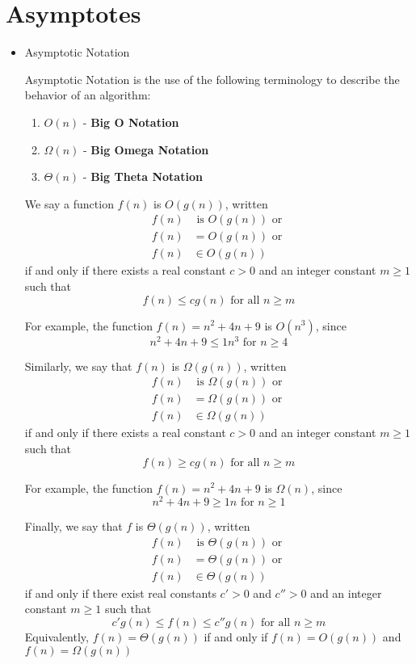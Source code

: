 \documentclass[a4paper]{article}
\begin{document}
\section{Asymptotes}
\begin{itemize}
\item Asymptotic Notation

Asymptotic Notation is the use of the following terminology to describe the behavior of an algorithm:
\begin{enumerate}
\item $O(n)$ - \textbf{Big O Notation}
\item $\Omega(n)$ - \textbf{Big Omega Notation}
\item $\Theta(n)$ - \textbf{Big Theta Notation}
\end{enumerate}

We say a function $f(n)$ is $O(g(n))$, written \begin{align*}f(n) &\text{ is } O(g(n))\text{ or }\\f(n)&=O(g(n))\text{ or }\\f(n)&\in O(g(n))\end{align*} if and only if there exists a real constant $c>0$ and an integer constant $m\geq1$ such that \[f(n)\leq cg(n) \text{ for all }n\geq m\] 

For example, the function $f(n)=n^2+4n+9$ is $O(n^3)$, since \[n^2+4n+9\leq 1n^3\text{ for } n\geq4\]

Similarly, we say that $f(n)$ is $\Omega(g(n))$, written \begin{align*}f(n) &\text{ is } \Omega(g(n))\text{ or }\\f(n)&=\Omega(g(n))\text{ or }\\f(n)&\in \Omega(g(n))\end{align*} if and only if there exists a real constant $c>0$ and an integer constant $m\geq1$ such that \[f(n)\geq cg(n) \text{ for all }n\geq m\] 

For example, the function $f(n)=n^2+4n+9$ is $\Omega(n)$, since \[n^2+4n+9\geq 1n\text{ for }n\geq1\]

Finally, we say that $f$ is $\Theta(g(n))$, written \begin{align*}f(n) &\text{ is } \Theta(g(n))\text{ or }\\f(n)&=\Theta(g(n))\text{ or }\\f(n)&\in \Theta(g(n))\end{align*} if and only if there exist real constants $c'>0$ and $c''>0$ and an integer constant $m\geq1$ such that \[c'g(n) \leq f(n)\leq c''g(n) \text{ for all }n\geq m\] Equivalently, $f(n)=\Theta(g(n))$ if and only if $f(n)=O(g(n))$ and $f(n)=\Omega(g(n))$


\end{itemize}
\end{document}
